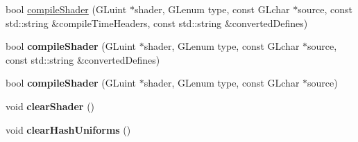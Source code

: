 \begin{DoxyCompactItemize}
bool \hyperlink{classGLProgram_acd1fcd39d2b900d77500665cf1c6e4bb}{compile\+Shader} (G\+Luint $\ast$shader, G\+Lenum type, const G\+Lchar $\ast$source, const std\+::string \&compile\+Time\+Headers, const std\+::string \&converted\+Defines)
\item 
\mbox{\label{classGLProgram_a839b443a144c0f29044f0ccadcf96d99}} 
bool {\bfseries compile\+Shader} (G\+Luint $\ast$shader, G\+Lenum type, const G\+Lchar $\ast$source, const std\+::string \&converted\+Defines)
\item 
\mbox{\label{classGLProgram_a5ab59d95b0ea9c508998d0cbcac25448}} 
bool {\bfseries compile\+Shader} (G\+Luint $\ast$shader, G\+Lenum type, const G\+Lchar $\ast$source)
\item 
\mbox{\label{classGLProgram_a21dbca986f6813e0f0014802b25bc2e8}} 
void {\bfseries clear\+Shader} ()
\item 
\mbox{\label{classGLProgram_a4169111c7e547471f27e3162d10eeec5}} 
void {\bfseries clear\+Hash\+Uniforms} ()
\end{DoxyCompactItemize}
